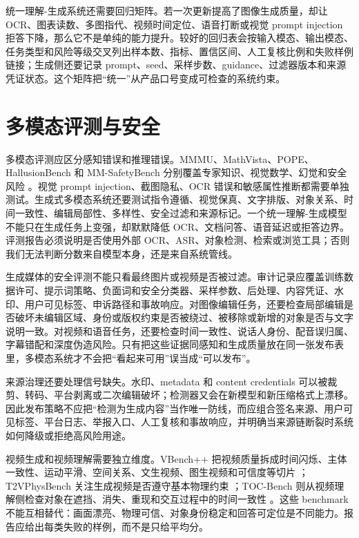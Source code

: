 \documentclass[UTF8,zihao=-4,openany]{ctexbook}
\begin{document}
统一理解-生成系统还需要回归矩阵。若一次更新提高了图像生成质量，却让 OCR、图表读数、多图指代、视频时间定位、语音打断或视觉 prompt injection 拒答下降，那么它不是单纯的能力提升。较好的回归表会按输入模态、输出模态、任务类型和风险等级交叉列出样本数、指标、置信区间、人工复核比例和失败样例链接；生成侧还要记录 prompt、seed、采样步数、guidance、过滤器版本和来源凭证状态。这个矩阵把“统一”从产品口号变成可检查的系统约束。

\section{多模态评测与安全}
多模态评测应区分感知错误和推理错误。MMMU、MathVista、POPE、HallusionBench 和 MM-SafetyBench 分别覆盖专家知识、视觉数学、幻觉和安全风险 \cite{yue2023mmmu,lu2023mathvista,li2023pope,guan2023hallusionbench,liu2023mmsafetybench}。视觉 prompt injection、截图隐私、OCR 错误和敏感属性推断都需要单独测试。生成式多模态系统还要测试指令遵循、视觉保真、文字排版、对象关系、时间一致性、编辑局部性、多样性、安全过滤和来源标记。一个统一理解-生成模型不能只在生成任务上变强，却默默降低 OCR、文档问答、语音延迟或拒答边界。评测报告必须说明是否使用外部 OCR、ASR、对象检测、检索或浏览工具；否则我们无法判断分数来自模型本身，还是来自系统管线。

生成媒体的安全评测不能只看最终图片或视频是否被过滤。审计记录应覆盖训练数据许可、提示词策略、负面词和安全分类器、采样参数、后处理、内容凭证、水印、用户可见标签、申诉路径和事故响应。对图像编辑任务，还要检查局部编辑是否破坏未编辑区域、身份或版权约束是否被绕过、被移除或新增的对象是否与文字说明一致。对视频和语音任务，还要检查时间一致性、说话人身份、配音误归属、字幕错配和深度伪造风险。只有把这些证据同感知和生成质量放在同一张发布表里，多模态系统才不会把“看起来可用”误当成“可以发布”。

来源治理还要处理信号缺失。水印、metadata 和 content credentials 可以被裁剪、转码、平台剥离或二次编辑破坏；检测器又会在新模型和新压缩格式上漂移。因此发布策略不应把“检测为生成内容”当作唯一防线，而应组合签名来源、用户可见标签、平台日志、举报入口、人工复核和事故响应，并明确当来源链断裂时系统如何降级或拒绝高风险用途。

视频生成和视频理解需要独立维度。VBench++ 把视频质量拆成时间闪烁、主体一致性、运动平滑、空间关系、文生视频、图生视频和可信度等切片 \cite{huang2024vbenchpp}；T2VPhysBench 关注生成视频是否遵守基本物理约束 \cite{guo2025t2vphysbench}；TOC-Bench 则从视频理解侧检查对象在遮挡、消失、重现和交互过程中的时间一致性 \cite{chen2026tocbench}。这些 benchmark 不能互相替代：画面漂亮、物理可信、对象身份稳定和回答可定位是不同能力。报告应给出每类失败的样例，而不是只给平均分。
\end{document}
